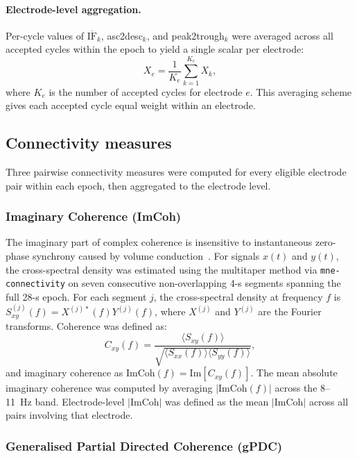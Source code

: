\documentclass[11pt, a4paper]{article}
\newcommand{\imcoh}{$|$ImCoh$|$}
\newcommand{\asc}{asc2desc}
\newcommand{\ptr}{peak2trough}
\begin{document}
\paragraph{Electrode-level aggregation.}
Per-cycle values of $\overline{\text{IF}}_k$, \asc$_k$, and \ptr$_k$ were
averaged across all accepted cycles within the epoch to yield a single
scalar per electrode:
%
\begin{equation}
  X_e = \frac{1}{K_e} \sum_{k=1}^{K_e} X_k,
\end{equation}
%
where $K_e$ is the number of accepted cycles for electrode $e$. This
averaging scheme gives each accepted cycle equal weight within an electrode.

\subsection{Connectivity measures}

Three pairwise connectivity measures were computed for every eligible electrode
pair within each epoch, then aggregated to the electrode level.

\subsubsection{Imaginary Coherence (ImCoh)}

The imaginary part of complex coherence is insensitive to instantaneous
zero-phase synchrony caused by volume conduction~\citep{nolte2004identifying}.
For signals $x(t)$ and $y(t)$, the cross-spectral density was estimated
using the multitaper method via \texttt{mne-connectivity} on seven
consecutive non-overlapping 4-s segments spanning the full 28-s epoch.
For each segment $j$, the cross-spectral density at frequency $f$ is
$S_{xy}^{(j)}(f) = X^{(j)*}(f) Y^{(j)}(f)$, where $X^{(j)}$ and
$Y^{(j)}$ are the Fourier transforms. Coherence was defined as:
%
\begin{equation}
  C_{xy}(f) = \frac{\langle S_{xy}(f) \rangle}
                   {\sqrt{\langle S_{xx}(f) \rangle \langle S_{yy}(f) \rangle}},
\end{equation}
%
and imaginary coherence as $\text{ImCoh}(f) = \text{Im}[C_{xy}(f)]$.
The mean absolute imaginary coherence was computed by averaging $|\text{ImCoh}(f)|$
across the 8--11~Hz band. Electrode-level \imcoh{} was defined as the mean
$|\text{ImCoh}|$ across all pairs involving that electrode.

\subsubsection{Generalised Partial Directed Coherence (gPDC)}
\end{document}
